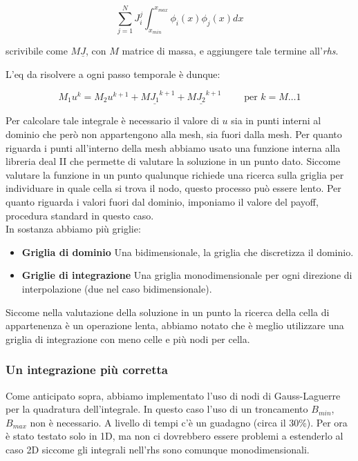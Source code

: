 \documentclass[a4paper,10pt]{article}
\begin{document}
\begin{equation*}
 \sum_{j=1}^N J_i^j\int_{x_{min}}^{x_{max}} \phi_i(x)\phi_j(x)dx
\end{equation*}

scrivibile come $M\underline{J}$, con $M$ matrice di massa, e aggiungere tale termine all'\emph{rhs}.

L'eq da risolvere a ogni passo temporale è dunque:

\begin{equation*}
 M_1u^k=M_2u^{k+1}+M\underline{J_1}^{k+1}+M\underline{J_2}^{k+1}  \qquad \text{ per } k=M\dots1
\end{equation*}


Per calcolare tale integrale è necessario il valore di $u$ sia in punti interni al dominio che per\`o non appartengono alla mesh, sia fuori dalla mesh. Per quanto riguarda i punti all'interno della mesh abbiamo usato una funzione interna alla libreria deal II che permette di valutare la soluzione in un punto dato. Siccome valutare la funzione in un punto qualunque richiede una ricerca sulla griglia per individuare in quale cella si trova il nodo, questo processo può essere lento. Per quanto riguarda i valori fuori dal dominio, imponiamo il valore del payoff, procedura standard in questo caso.\\

In sostanza abbiamo più griglie:
\begin{itemize}
 \item \textbf{Griglia di dominio} Una bidimensionale, la griglia che discretizza il dominio.
 \item \textbf{Griglie di integrazione} Una griglia monodimensionale per ogni direzione di interpolazione (due nel caso bidimensionale).
\end{itemize}

Siccome nella valutazione della soluzione in un punto la ricerca della cella di appartenenza è un operazione lenta, abbiamo notato che è meglio utilizzare una griglia di integrazione con meno celle e più nodi per cella.

\subsubsection{Un integrazione più corretta}
Come anticipato sopra, abbiamo implementato l'uso di nodi di Gauss-Laguerre per la quadratura dell'integrale. In questo caso l'uso di un troncamento $B_{min}$, $B_{max}$ non è necessario. A livello di tempi c'è un guadagno (circa il 30\%). Per ora \`e stato testato solo in 1D, ma non ci dovrebbero essere problemi a estenderlo al caso 2D siccome gli integrali nell'rhs sono comunque monodimensionali.
\end{document}

